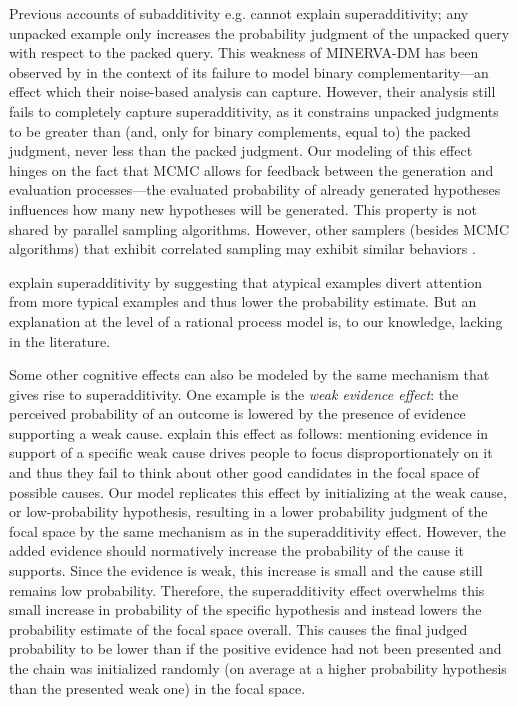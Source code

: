 Previous accounts of subadditivity e.g. \citet{Thomas2008, MINERVAsub} cannot explain superadditivity; any unpacked example only increases the probability judgment of the unpacked query with respect to the packed query. This weakness of MINERVA-DM has been observed by \citet{Costello2014} in the context of its failure to model binary complementarity---an effect which their noise-based analysis can capture. However, their analysis still fails to completely capture superadditivity, as it constrains unpacked judgments to be greater than (and, only for binary complements, equal to) the packed judgment, never less than the packed judgment. 
Our modeling of this effect hinges on the fact that MCMC allows for feedback between the generation and evaluation processes---the evaluated probability of already generated hypotheses influences how many new hypotheses will be generated. This property is not shared by  parallel sampling algorithms. However, other samplers (besides MCMC algorithms) that exhibit correlated sampling may exhibit similar behaviors \citep[see for example][]{Bonawitz2014}.

\citet{super} explain superadditivity by suggesting that atypical examples divert attention from more typical examples and thus lower the probability estimate. But an explanation at the level of a rational process model is, to our knowledge, lacking in the literature. 


Some other cognitive effects can also be modeled by the same mechanism that gives rise to superadditivity. One example is the \emph{weak evidence effect}: the perceived probability of an outcome is lowered by the presence of evidence supporting a weak cause. %
 \citet{weak} explain this effect as follows: mentioning evidence in support of a specific weak cause drives people to focus disproportionately on it and thus they fail to think about other good candidates in the focal space of possible causes. Our model replicates this effect by initializing at the weak cause, or low-probability hypothesis, resulting in a lower probability judgment of the focal space by the same mechanism as in the superadditivity effect. However, the added evidence should normatively increase the probability of the cause it supports. Since the evidence is weak, this increase is small and the cause still remains low probability. Therefore, the superadditivity effect overwhelms this small increase in probability of the specific hypothesis and instead lowers the probability estimate of the focal space overall. This causes the final judged probability to be lower than if the positive evidence had not been presented and the chain was initialized randomly (on average at a higher probability hypothesis than the presented weak one) in the focal space.

